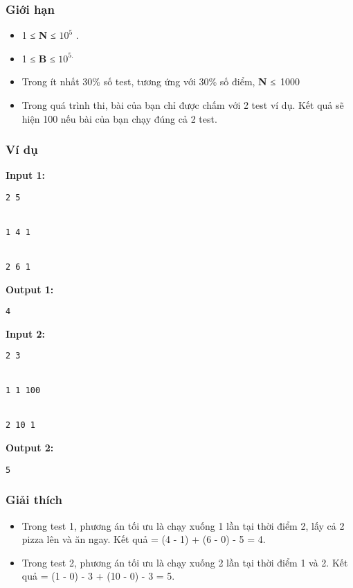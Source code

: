 \subsubsection{   Giới hạn  }
\begin{itemize}
	\item     1         ≤     \textbf{      N     }      ≤ $10^{5}$      .     
	\item     1 ≤    \textbf{     B    }    ≤ $10^{5.}$
	\item     Trong ít nhất 30\% số test, tương ứng với 30\% số điểm,    \textbf{     N    }    ≤ 1000   
	\item     Trong quá trình thi, bài của bạn chỉ được chấm với 2 test ví dụ. Kết quả sẽ hiện 100 nếu bài của bạn chạy đúng cả 2 test.   
\end{itemize}

\subsubsection{   Ví dụ  }

\textbf{    Input 1:   }
\begin{verbatim}
2 5


1 4 1


2 6 1\end{verbatim}

\textbf{    Output 1:   }
\begin{verbatim}
4\end{verbatim}

\textbf{    Input 2:   }
\begin{verbatim}
2 3


1 1 100


2 10 1\end{verbatim}

\textbf{    Output 2:   }
\begin{verbatim}
5\end{verbatim}

\subsubsection{   Giải thích  }
\begin{itemize}
	\item     Trong test 1, phương án tối ưu là chạy xuống 1 lần tại thời điểm 2, lấy cả 2 pizza lên và ăn ngay. Kết quả = (4 - 1) + (6 - 0) - 5 = 4.   
	\item     Trong test 2, phương án tối ưu là chạy xuống 2 lần tại thời điểm 1 và 2. Kết quả = (1 - 0) - 3 + (10 - 0) - 3 = 5.   
\end{itemize}
